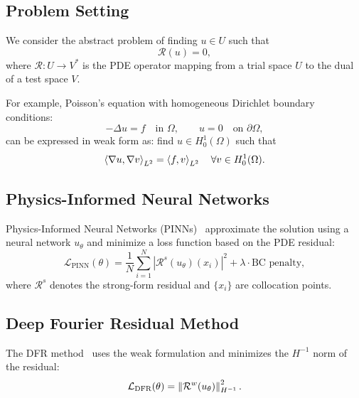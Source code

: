 
\subsection{Problem Setting}

We consider the abstract problem of finding $u \in U$ such that
\begin{equation}
    \mathcal{R}(u) = 0,
\end{equation}
where $\mathcal{R}: U \to V^*$ is the PDE operator mapping from a trial space $U$ to the dual of a test space $V$.

For example, Poisson's equation with homogeneous Dirichlet boundary conditions:
\begin{equation}
    -\Delta u = f \quad \text{in } \Omega, \qquad u = 0 \quad \text{on } \partial\Omega,
\end{equation}
can be expressed in weak form as: find $u \in H^1_0(\Omega)$ such that
\begin{equation}
    \left\langle \nabla u, \nabla v \right\rangle_{L^2} = \left\langle f, v \right\rangle_{L^2} \quad \forall v \in H^1_0(\Omega).
\end{equation}

\subsection{Physics-Informed Neural Networks}

Physics-Informed Neural Networks (PINNs)~\cite{raissi2019physics} approximate the solution using a neural network $u_\theta$ and minimize a loss function based on the PDE residual:
\begin{equation}
    \mathcal{L}_{\text{PINN}}(\theta) = \frac{1}{N} \sum_{i=1}^{N} |\mathcal{R}^s(u_\theta)(x_i)|^2 + \lambda \cdot \text{BC penalty},
\end{equation}
where $\mathcal{R}^s$ denotes the strong-form residual and $\{x_i\}$ are collocation points.

\subsection{Deep Fourier Residual Method}

The DFR method~\cite{taylor2023deep} uses the weak formulation and minimizes the $H^{-1}$ norm of the residual:
\begin{equation}
    \mathcal{L}_{\text{DFR}}(\theta) = \left\|\mathcal{R}^w(u_\theta)\right\|_{H^{-1}}^2.
\end{equation}

